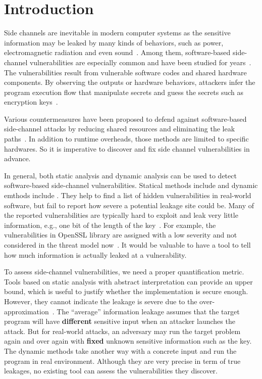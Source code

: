 \section{Introduction}
Side channels are inevitable in modern computer systems as the sensitive information 
may be leaked by many kinds of behaviors, 
such as power, electromagnetic radiation and even sound~\cite{}. 
Among them, software-based side-channel vulnerabilities are especially common and have been studied for years~\cite{}. 
The vulnerabilities result from vulnerable software codes and shared hardware components.
By observing the outputs or hardware behaviors, attackers 
infer the program execution flow that manipulate secrets and 
guess the secrets such as encryption keys~\cite{}.

Various countermeasures have been proposed to defend against 
software-based side-channel attacks by reducing shared resources
and eliminating the leak paths~\cite{182946,203878,217537}. 
In addition to runtime overheads, those methods are limited to specific hardwares. 
So it is imperative to discover and fix side channel vulnerabilities in advance.

In general, both static analysis and dynamic analysis
can be used to detect software-based side-channel vulnerabilities.
Statical methods include  and dynamic emthods include .
They help to find a list of hidden vulnerabilities in real-world software, 
but fail to report how severe a potential leakage site could be. 
Many of the reported vulnerabilities are typically hard to exploit
and leak very little information, e.g., one bit of the length of the key~\cite{203878}.  
For example, the vulnerabilities in OpenSSL library are assigned with a low severity 
and not considered 
in the threat model now~\cite{https://www.openssl.org/policies/secpolicy.html}. 
It would be valuable to have a tool to tell how much information is actually leaked 
at a vulnerability.

To assess side-channel vulnerabilities, we need a proper quantification metric.
Tools based on static analysis with abstract interpretation can provide an upper bound, 
which is useful to justify whether the implementation is secure enough. 
However, they cannot indicate the leakage is severe due to the over-approximation~\cite{}. 
The ``average'' information leakage assumes that the target program will have 
\textbf{different} sensitive 
input when an attacker launches the attack.
But for real-world attacks, an adversary may run the target problem again and over again 
with \textbf{fixed} unknown sensitive information such as the key.
The dynamic methods take another way with a concrete input and run the program in real
environment. 
Although they are very precise in term of true leakages, no existing tool can
assess the vulnerabilities they discover.

